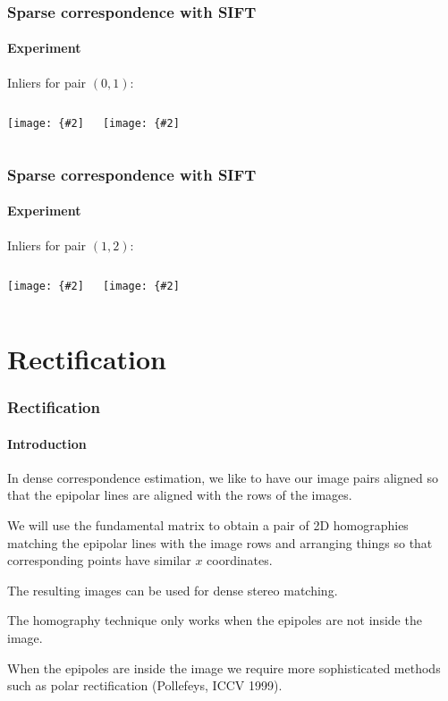 \documentclass[aspectratio=169]{beamer}
\newcommand{\myfig}[3]{\centerline{\texttt{[image: \{\#2]}}}
    \centerline{\scriptsize #3}}
\begin{document}
\begin{frame}
\frametitle{Sparse correspondence with SIFT}
\framesubtitle{Experiment}

Inliers for pair $(0,1)$:

\medskip

\begin{columns}
\column{2.25in}
\myfig{2.2in}{Golf-0from1-corr}{Image 0 matches to image 1}
\column{2.25in}
\myfig{2.2in}{Golf-1from0-corr}{Image 1 matches from image 0}
\end{columns}

\end{frame}


\begin{frame}
\frametitle{Sparse correspondence with SIFT}
\framesubtitle{Experiment}

Inliers for pair $(1,2)$:

\medskip

\begin{columns}
\column{2.25in}
\myfig{2.2in}{Golf-1from2-corr}{Image 1 matches to image 2}
\column{2.25in}
\myfig{2.2in}{Golf-2from1-corr}{Image 2 matches from image 1}
\end{columns}

\end{frame}

\section{Rectification}

\begin{frame}
\frametitle{Rectification}
\framesubtitle{Introduction}

In \alert{dense correspondence estimation}, we like to have our image
pairs aligned so that the epipolar lines are \alert{aligned with the
  rows} of the images.

\medskip

We will use the fundamental matrix to obtain a pair of 2D homographies
\alert{matching the epipolar lines with the image rows} and arranging
things so that corresponding points have \alert{similar $x$
  coordinates}.

\medskip

The resulting images can be used for \alert{dense stereo matching}.

\medskip

The homography technique only works \alert{when the epipoles are
    not inside the image}.

\medskip

When the epipoles are \alert{inside the image} we require more sophisticated
methods such as \alert{polar rectification} (Pollefeys, ICCV 1999).

\end{frame}
\end{document}
